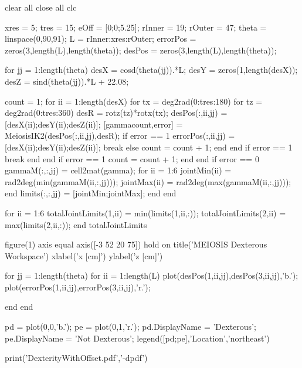 
clear all
close all
clc

xres = 5;                  %
tres = 15;                   %
eOff = [0;0;5.25];          %
rInner = 19;                %
rOuter = 47;                %
theta = linspace(0,90,91);  %
L = rInner:xres:rOuter;     %
errorPos = zeros(3,length(L),length(theta));
desPos = zeros(3,length(L),length(theta));

for jj = 1:length(theta)
    desX = cosd(theta(jj)).*L;
    desY = zeros(1,length(desX));
    desZ = sind(theta(jj)).*L + 22.08;

    count = 1;
    for ii = 1:length(desX)
        for tx = deg2rad(0:tres:180)
            for tz = deg2rad(0:tres:360)
                desR = rotz(tz)*rotx(tx);
                desPos(:,ii,jj) = [desX(ii);desY(ii);desZ(ii)];
                [gamma{count},error] = MeiosisIK2(desPos(:,ii,jj),desR);
                if error == 1
                    errorPos(:,ii,jj) = [desX(ii);desY(ii);desZ(ii)];
                    break
                else
                    count = count + 1;
                end
            end
            if error == 1
                break
            end
        end
        if error == 1
            count = count + 1;
        end
    end
    if error == 0
        gammaM(:,:,jj) = cell2mat(gamma);
        for ii = 1:6
            jointMin(ii) = rad2deg(min(gammaM(ii,:,jj)));
            jointMax(ii) = rad2deg(max(gammaM(ii,:,jj)));
        end
        limits(:,:,jj) = [jointMin;jointMax];
    end
end

for ii = 1:6
    totalJointLimits(1,ii) = min(limits(1,ii,:));
    totalJointLimits(2,ii) = max(limits(2,ii,:));
end
totalJointLimits

figure(1)
axis equal
axis([-3 52 20 75])
hold on
title('MEIOSIS Dexterous Workspace')
xlabel('x [cm]')
ylabel('z [cm]')

for jj = 1:length(theta)
    for ii = 1:length(L)
        plot(desPos(1,ii,jj),desPos(3,ii,jj),'b.');
        plot(errorPos(1,ii,jj),errorPos(3,ii,jj),'r.');

    end
end

pd = plot(0,0,'b.');
pe = plot(0,1,'r.');
pd.DisplayName = 'Dexterous';
pe.DisplayName = 'Not Dexterous';
legend([pd;pe],'Location','northeast')

print('DexterityWithOffset.pdf','-dpdf')
%
